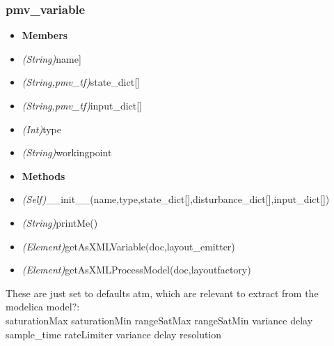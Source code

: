 \documentclass{report}
\begin{document}
\subsubsection{pmv\_variable}
\begin{itemize}[label=]
\item \textbf{Members}
\end{itemize}
\begin{itemize}[label=\_\_]
\item\textit{(String)}name]
\item\textit{(String,pmv\_tf)}state\_dict[]
\item\textit{(String,pmv\_tf)}input\_dict[]
\item\textit{(Int)}type
\item\textit{(String)}workingpoint

\end{itemize}
\begin{itemize}[label=]
\item \textbf{Methods}
\end{itemize}
\begin{itemize}[label=+]
\item\textit{(Self)}\_\_init\_\_(name,type,state\_dict[],disturbance\_dict[],input\_dict[])
\item\textit{(String)}printMe()
\item\textit{(Element)}getAsXMLVariable(doc,layout\_emitter)
\item\textit{(Element)}getAsXMLProcessModel(doc,layoutfactory)
\end{itemize}
These are just set to defaults atm, which are relevant to extract from the modelica model?:\\\newline
saturationMax\newline
saturationMin\newline
rangeSatMax\newline
rangeSatMin\newline
variance\newline
delay\newline
sample\_time\newline
rateLimiter\newline
variance\newline
delay\newline
resolution\newline
\end{document}
